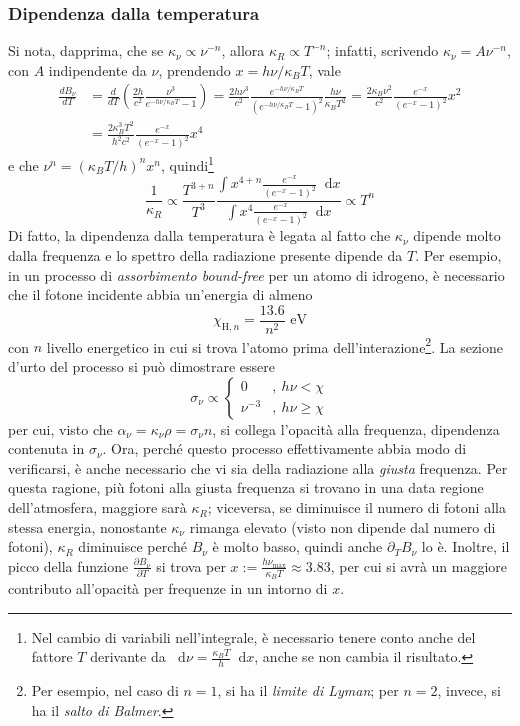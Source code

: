 \documentclass[11pt, a4paper]{scrartcl}
\theoremstyle{style}
\theoremstyle{style1}
\newcommand{\dd}{\mathop{}\!\mathrm{d}}
\numberwithin{equation}{subsection}
\begin{document}
\subsubsection{Dipendenza dalla temperatura}
Si nota, dapprima, che se $\kappa _\nu \propto \nu ^{-n}$, allora $\kappa _R \propto T^{-n}$; infatti, scrivendo $\kappa _\nu = A \nu ^{-n}$, con $A$ indipendente da $\nu $, prendendo $x = h\nu /\kappa _BT$, vale
\[
	\begin{split}
		\frac{d B_\nu }{d T}  &= \frac{d }{d T} \left(\frac{2h}{c^2} \frac{\nu ^3}{e^{-h\nu / \kappa _B T}-1}\right) = \frac{2h \nu ^3}{c^2} \frac{e^{-h \nu  / \kappa _B T }}{\left(e^{-h\nu /\kappa _B T } - 1\right) ^2} \frac{h\nu }{\kappa _B T^2} = \frac{2 \kappa _B \nu ^2}{c^2} \frac{e^{-x}}{(e^{-x}-1)^2}x^2\\
				      &= \frac{2 \kappa _B ^3 T^2}{h^2 c^2} \frac{e^{-x}}{(e^{-x}-1)^2} x^4
	\end{split}
\] 
e che $\nu ^{n}= (\kappa _B T / h)^n x^n$, quindi\footnote{Nel cambio di variabili nell'integrale, \`e necessario tenere conto anche del fattore $T$ derivante da $\dd \nu = \frac{\kappa _B T }{h} \dd x$, anche se non cambia il risultato.}
\[
	\frac{1}{\kappa _R} \propto \frac{T^{3+n} }{T^3} \frac{ \displaystyle \int x^{4 + n} \frac{e^{-x}}{(e^{-x}-1)^2}\dd x}{\displaystyle \int x^4 \frac{e^{-x}}{(e^{-x}-1)^2}\dd x}\propto T^n
\] 
Di fatto, la dipendenza dalla temperatura \`e legata al fatto che $\kappa _\nu $ dipende molto dalla frequenza e lo spettro della radiazione presente dipende da $T$.
Per esempio, in un processo di \textit{assorbimento bound-free} per un atomo di idrogeno, \`e necessario che il fotone incidente abbia un'energia di almeno
\[
\chi _{\mathrm{H} ,n}  = \frac{13.6}{n^2} \text{ eV}
\] 
con $n$ livello energetico in cui si trova l'atomo prima dell'interazione\footnote{Per esempio, nel caso di $n=1$, si ha il \textit{limite di Lyman}; per $n=2$, invece, si ha il \textit{salto di Balmer}.}.
La sezione d'urto del processo si pu\`o dimostrare essere
\[
	\sigma _\nu \propto \begin{cases}
		0 &,\ h \nu < \chi \\
		\nu ^{-3} &,\ h\nu \ge \chi 
	\end{cases}
\] 
per cui, visto che $\alpha _\nu  = \kappa _\nu  \rho  = \sigma _\nu n$, si collega l'opacit\`a alla frequenza, dipendenza contenuta in $\sigma _\nu$.
Ora, perch\'e questo processo effettivamente abbia modo di verificarsi, \`e anche necessario che vi sia della radiazione alla \textit{giusta} frequenza.
Per questa ragione, pi\`u fotoni alla giusta frequenza si trovano in una data regione dell'atmosfera, maggiore sar\`a $\kappa _R$; viceversa, se diminuisce il numero di fotoni alla stessa energia, nonostante $\kappa _\nu $ rimanga elevato (visto non dipende dal numero di fotoni), $\kappa _R$ diminuisce perch\'e $B_\nu $ \`e molto basso, quindi anche $\partial _T B_\nu $ lo \`e.
Inoltre, il picco della funzione $\frac{\partial B_\nu }{\partial T} $ si trova per $x:=\frac{h\nu_\text{max} }{\kappa _B T}\approx 3.83$, per cui si avr\`a un maggiore contributo all'opacit\`a per frequenze in un intorno di $x$.
\end{document}
